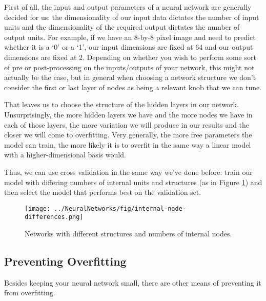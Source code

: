 First of all, the input and output parameters of a neural network are generally decided for us: the dimensionality of our input data dictates the number of input units and the dimensionality of the required output dictates the number of output units. For example, if we have an 8-by-8 pixel image and need to predict whether it is a `0' or a `1', our input dimensions are fixed at 64 and our output dimensions are fixed at 2. Depending on whether you wish to perform some sort of pre or post-processing on the inputs/outputs of your network, this might not actually be the case, but in general when choosing a network structure we don't consider the first or last layer of nodes as being a relevant knob that we can tune.

That leaves us to choose the structure of the hidden layers in our network. Unsurprisingly, the more hidden layers we have and the more nodes we have in each of those layers, the more variation we will produce in our results and the closer we will come to overfitting. Very generally, the more free parameters the model can train, the more likely it is to overfit in the same way a linear model with a higher-dimensional basis would. 

Thus, we can use cross validation in the same way we've done before: train our model with differing numbers of internal units and structures (as in Figure \ref{fig:internal-node-differences}) and then select the model that performs best on the validation set.

\begin{figure}
    \centering
    \texttt{[image: ../NeuralNetworks/fig/internal-node-differences.png]}
    \caption{Networks with different structures and numbers of internal nodes.}
    \label{fig:internal-node-differences}
\end{figure}


\subsection{Preventing Overfitting}
Besides keeping your neural network small, there are other means of preventing it from overfitting.

